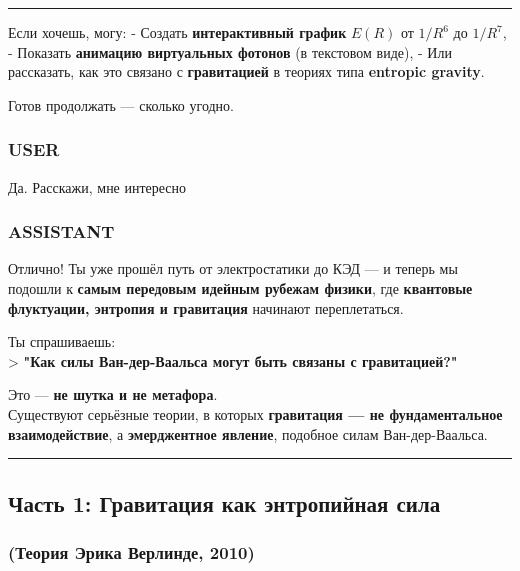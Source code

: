 \documentclass[11pt]{article}
\begin{document}
\begin{center}\rule{0.5\linewidth}{\linethickness}\end{center}

Если хочешь, могу: - Создать \textbf{интерактивный график} \(E(R)\) от
\(1/R^6\) до \(1/R^7\), - Показать \textbf{анимацию виртуальных фотонов}
(в текстовом виде), - Или рассказать, как это связано с
\textbf{гравитацией} в теориях типа \textbf{entropic gravity}.

Готов продолжать --- сколько угодно.

\subsubsection{USER}\label{user-6}

Да. Расскажи, мне интересно

\subsubsection{ASSISTANT}\label{assistant-6}

Отлично! Ты уже прошёл путь от электростатики до КЭД --- и теперь мы
подошли к \textbf{самым передовым идейным рубежам физики}, где
\textbf{квантовые флуктуации, энтропия и гравитация} начинают
переплетаться.

Ты спрашиваешь:\\
\textgreater{} \textbf{"Как силы Ван-дер-Ваальса могут быть связаны с
гравитацией?"}

Это --- \textbf{не шутка и не метафора}.\\
Существуют серьёзные теории, в которых \textbf{гравитация --- не
фундаментальное взаимодействие}, а \textbf{эмерджентное явление},
подобное силам Ван-дер-Ваальса.

\begin{center}\rule{0.5\linewidth}{\linethickness}\end{center}

\subsection{\texorpdfstring{Часть 1: \textbf{Гравитация как энтропийная
сила}}{Часть 1: Гравитация как энтропийная сила}}\label{ux447ux430ux441ux442ux44c-1-ux433ux440ux430ux432ux438ux442ux430ux446ux438ux44f-ux43aux430ux43a-ux44dux43dux442ux440ux43eux43fux438ux439ux43dux430ux44f-ux441ux438ux43bux430}

\subsubsection{(Теория Эрика Верлинде,
2010)}\label{ux442ux435ux43eux440ux438ux44f-ux44dux440ux438ux43aux430-ux432ux435ux440ux43bux438ux43dux434ux435-2010}
\end{document}
